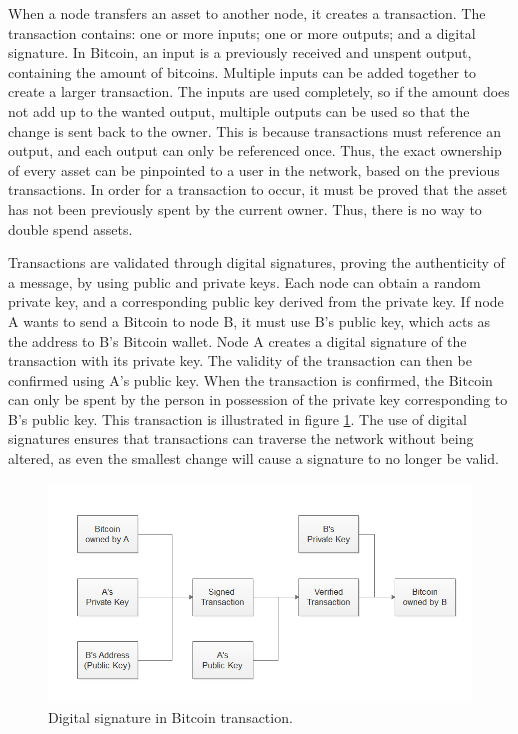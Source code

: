 When a node transfers an asset to another node, it creates a transaction. The transaction contains: one or more inputs; one or more outputs; and a digital signature. In Bitcoin, an input is a previously received and unspent output, containing the amount of bitcoins. Multiple inputs can be added together to create a larger transaction. The inputs are used completely, so if the amount does not add up to the wanted output, multiple outputs can be used so that the change is sent back to the owner. This is because transactions must reference an output, and each output can only be referenced once. Thus, the exact ownership of every asset can be pinpointed to a user in the network, based on the previous transactions. In order for a transaction to occur, it must be proved that the asset has not been previously spent by the current owner. Thus, there is no way to double spend assets.

Transactions are validated through digital signatures, proving the authenticity of a message, by using public and private keys. Each node can obtain a random private key, and a corresponding public key derived from the private key. If node A wants to send a Bitcoin to node B, it must use B's public key, which acts as the address to B's Bitcoin wallet. Node A creates a digital signature of the transaction with its private key. The validity of the transaction can then be confirmed using A's public key. When the transaction is confirmed, the Bitcoin can only be spent by the person in possession of the private key corresponding to B's public key. This 
transaction is illustrated in figure \ref{fig:sign}. The use of digital signatures ensures that transactions can traverse the network without being altered, as even the smallest change will cause a signature to no longer be valid. 

\begin{figure}[!htb]
\centering
	\includegraphics[width=1\textwidth]{Images/sign}
	\caption{Digital signature in Bitcoin transaction.}
	\label{fig:sign}
\end{figure}

